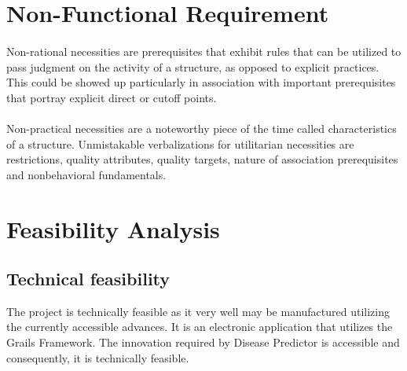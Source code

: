 \documentclass[oneside,12pt]{Classes/VTU}
\begin{document}
    	
    	\section{Non-Functional Requirement}
    	\paragraph{}
    	Non-rational necessities are prerequisites that exhibit rules that can be utilized to pass judgment on the activity of a structure, as opposed to explicit practices. This could be showed up particularly in association with important prerequisites that portray explicit direct or cutoff points. 
    	\paragraph{} 
    	Non-practical necessities are a noteworthy piece of the time called characteristics of a structure. Unmistakable verbalizations for utilitarian necessities are restrictions, quality attributes, quality targets, nature of association prerequisites and nonbehavioral fundamentals.
    	
    	\section{Feasibility Analysis}
    	\subsection{Technical feasibility} 
    	The project is technically feasible as it very well may be manufactured utilizing the currently accessible advances. It is an electronic application that utilizes the Grails Framework. The innovation required by Disease Predictor is accessible and consequently, it is technically feasible.
    	
\end{document}
